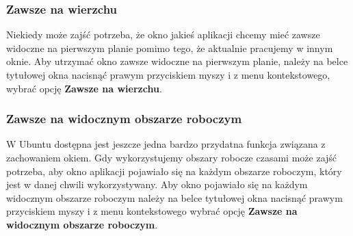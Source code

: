 \subsubsection{Zawsze na wierzchu}
Niekiedy może zajść potrzeba, że okno jakieś aplikacji chcemy mieć zawsze widoczne na pierwszym planie pomimo tego, że aktualnie pracujemy w innym oknie. Aby utrzymać okno zawsze widoczne na pierwszym planie, należy na belce tytułowej okna nacisnąć prawym przyciskiem myszy i z menu kontekstowego, wybrać opcję \textbf{Zawsze na wierzchu}.

\subsubsection{Zawsze na widocznym obszarze roboczym}
W Ubuntu dostępna jest jeszcze jedna bardzo przydatna funkcja związana z zachowaniem okiem. Gdy wykorzystujemy obszary robocze czasami może zajść potrzeba, aby okno aplikacji pojawiało się na każdym obszarze roboczym, który jest w danej chwili wykorzystywany. Aby okno pojawiało się na każdym widocznym obszarze roboczym należy na belce tytułowej okna nacisnąć prawym przyciskiem myszy i z menu kontekstowego wybrać opcję \textbf{Zawsze na widocznym obszarze roboczym}.
\clearpage


